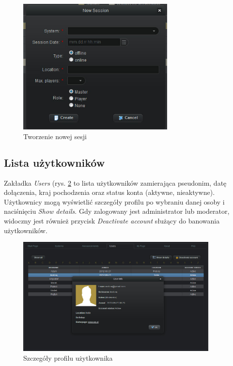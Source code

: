 \begin{figure}[h!]	
\centering
\includegraphics[width=0.7\textwidth]{./img/interfejsy/create_session}
\caption{Tworzenie nowej sesji}
\label{fig:create_session}
\end{figure}

\clearpage
\subsection*{Lista użytkowników}
\label{sec:users_detail}
\hspace{15pt}Zakładka \emph{Users} (rys. \ref{fig:users_details} to lista użytkowników zamierająca pseudonim, datę dołączenia, kraj pochodzenia oraz status konta (aktywne, nieaktywne). Użytkownicy mogą wyświetlić szczegóły profilu po wybraniu danej osoby i naciśnięciu \emph{Show details}. Gdy zalogowany jest administrator lub moderator, widoczny jest również przycisk \emph{Deactivate account} służący do banowania użytkowników. 

\begin{figure}[h!]	
\centering
\includegraphics[width=0.9\textwidth]{./img/interfejsy/users_details}
\caption{Szczegóły profilu użytkownika}
\label{fig:users_details}
\end{figure}

